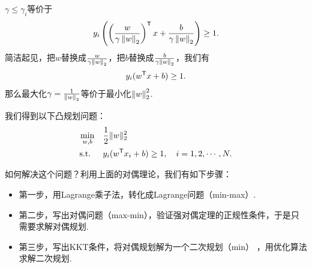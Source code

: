 $\gamma\le\gamma_i$等价于$$y_i\left(\left(\frac{w}{\gamma\left\|w\right\|_2}\right)^{\mathsf{T}} x+\frac{b}{\gamma\left\|w\right\|_2}\right)\geq 1.$$
简洁起见，把$w$替换成$\frac{w}{\gamma\left\|w\right\|_2}$，把$b$替换成$\frac{b}{\gamma\left\|w\right\|_2}$，我们有$$y_i(w^{\mathsf{T}} x+b)\geq 1.$$
那么最大化$\gamma=\frac{1}{\left\|w\right\|_2}$等价于最小化$\left\|w\right\|_2^2$. 

我们得到以下凸规划问题：
\begin{align*}
    \min_{w,b}\quad&\frac{1}{2}\|w\|_2^2\\
    \text{s.t. }\quad &y_i(w^{\mathsf{T}} x_i+b)\geq 1,\quad i=1,2,\cdots, N.
\end{align*}

如何解决这个问题？利用上面的对偶理论，我们有如下步骤：
\begin{itemize}
    \item 第一步，用Lagrange乘子法，转化成Lagrange问题（min-max）.
    \item 第二步，写出对偶问题（max-min），验证强对偶定理的正规性条件，于是只需要求解对偶规划.
    \item 第三步，写出KKT条件，将对偶规划解为一个二次规划（min） ，用优化算法求解二次规划.
\end{itemize}

